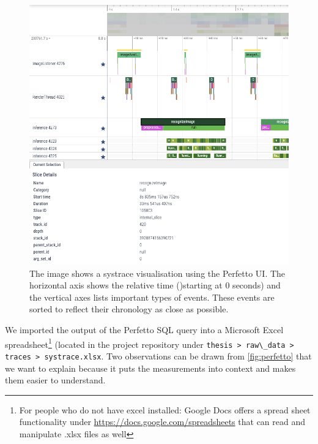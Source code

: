 \documentclass[
			   fontsize=11pt,
               paper=a4,
               bibliography=totoc,
               idxtotoc,
               headsepline,
               footsepline,
               footinclude=false,
               BCOR=12mm,
               DIV=13,
               openany,   %
               ]
               {scrbook}
\newcommand{\code}[1]{\lstinline[basicstyle = \ttfamily\small]{#1}} %
\begin{document}
\begin{figure}[h] %
	\centering
	\includegraphics[width=.97\textwidth]{figures/perfetto_visualisation.png}
	\caption[Screenshot of Visual Systrace Analysis With Perfetto UI]{The image shows a systrace visualisation using the Perfetto UI. The horizontal axis shows the relative time ()starting at 0 seconds) and the vertical axes lists important types of events. These events are sorted to reflect their chronology as close as possible.}
	\label{fig:perfetto}
\end{figure}

\newpage

We imported the output of the Perfetto SQL query into a Microsoft Excel spreadsheet\footnote{For people who do not have excel installed: Google Docs offers a spread sheet functionality under \url{https://docs.google.com/spreadsheets} that can read and manipulate .xlsx files as well} (located in the project repository under \code{thesis > raw\_data > traces > systrace.xlsx}. Two observations can be drawn from \autoref{fig:perfetto} that we want to explain because it puts the measurements into context and makes them easier to understand. \\
\end{document}
